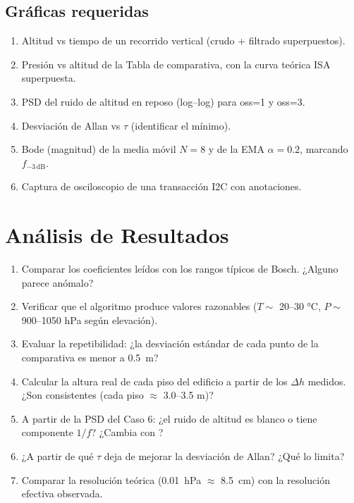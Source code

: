 \documentclass[11pt]{article}
\begin{document}
\subsection{Gráficas requeridas}
\begin{enumerate}
  \item Altitud vs tiempo de un recorrido vertical (crudo + filtrado superpuestos).
  \item Presión vs altitud de la Tabla de comparativa, con la curva teórica ISA superpuesta.
  \item PSD del ruido de altitud en reposo (log--log) para oss=1 y oss=3.
  \item Desviación de Allan vs $\tau$ (identificar el mínimo).
  \item Bode (magnitud) de la media móvil $N=8$ y de la EMA $\alpha=0.2$, marcando $f_{-3\,\text{dB}}$.
  \item Captura de osciloscopio de una transacción I2C con anotaciones.
\end{enumerate}

\section{Análisis de Resultados}
\begin{enumerate}
  \item Comparar los coeficientes leídos con los rangos típicos de Bosch. ¿Alguno parece
        anómalo?
  \item Verificar que el algoritmo produce valores razonables ($T\sim$ 20--30 \si{\celsius},
        $P\sim$ 900--1050 hPa según elevación).
  \item Evaluar la repetibilidad: ¿la desviación estándar de cada punto de la comparativa
        es menor a \SI{0.5}{\meter}?
  \item Calcular la altura real de cada piso del edificio a partir de los $\Delta h$
        medidos. ¿Son consistentes (cada piso $\approx$ 3.0--3.5 m)?
  \item A partir de la PSD del Caso 6: ¿el ruido de altitud es blanco o tiene componente
        $1/f$? ¿Cambia con ?
  \item ¿A partir de qué $\tau$ deja de mejorar la desviación de Allan? ¿Qué lo limita?
  \item Comparar la resolución teórica (\SI{0.01}{\hecto\pascal} $\approx$ \SI{8.5}{\centi\meter})
        con la resolución efectiva observada.
\end{enumerate}
\end{document}
